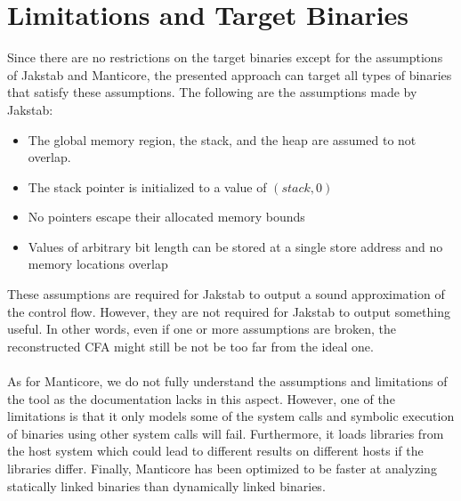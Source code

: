 \documentclass{kththesis}
\newcommand{\fbcomment}[1]{{#1}}
\renewcommand{\fbcomment}[1]{}
\begin{document}
\section{Limitations and Target Binaries}
\fbcomment{\color{red}Goal: Describe what assumptions are required for Jakstab and Manticore to work as expected.}
%
%
%
%
Since there are no restrictions on the target binaries except for the assumptions of Jakstab and Manticore, the presented approach can target all types of binaries that satisfy these assumptions. The following are the assumptions made by Jakstab:
\begin{itemize}
    \item The global memory region, the stack, and the heap are assumed to not overlap.
    \item The stack pointer is initialized to a value of $(stack,0)$
    \item No pointers escape their allocated memory bounds
    \item Values of arbitrary bit length can be stored at a single store address and no memory locations overlap
\end{itemize}
These assumptions are required for Jakstab to output a sound approximation of the control flow. However, they are not required for Jakstab to output something useful. In other words, even if one or more assumptions are broken, the reconstructed CFA might still be not be too far from the ideal one. 
\\ \\
As for Manticore, we do not fully understand the assumptions and limitations of the tool as the documentation lacks in this aspect. However, one of the limitations is that it only models some of the system calls and symbolic execution of binaries using other system calls will fail\cite{feliam}. Furthermore, it loads libraries from the host system which could lead to different results on different hosts if the libraries differ\cite{feliam}. Finally, Manticore has been optimized to be faster at analyzing statically linked binaries than dynamically linked binaries\cite{feliam}. 
\end{document}
